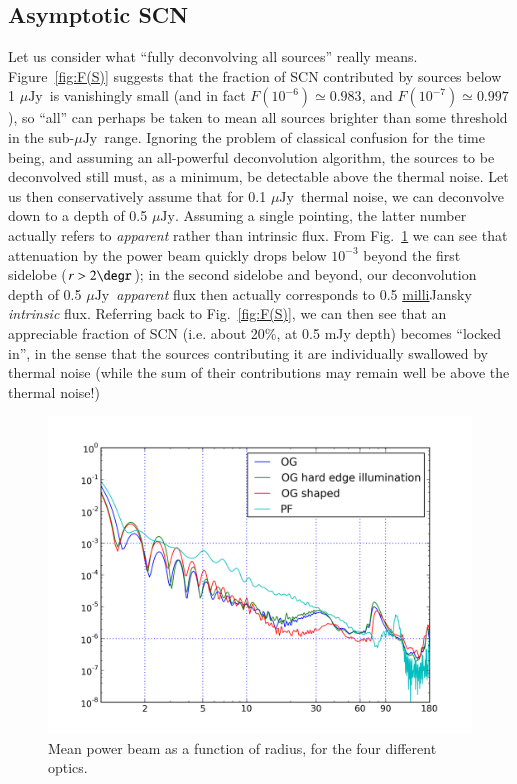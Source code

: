 \documentclass{aa}
\newcommand{\uJy}{$\mu\mathrm{Jy}$}
\begin{document}
\subsection{Asymptotic SCN}
\label{sec:asymptotic-fscn}

Let us consider what ``fully deconvolving all sources'' really means. Figure~\ref{fig:F(S)} suggests that the fraction of SCN contributed by sources below 1 \uJy\ is vanishingly small (and in fact $F(10^{-6})\simeq0.983$, and $F(10^{-7})\simeq0.997$), so ``all'' can perhaps be taken to mean all sources brighter than some threshold in the sub-\uJy\ range. Ignoring the problem of classical confusion for the time being, and assuming an all-powerful deconvolution algorithm, the sources to be deconvolved still must, as a minimum, be detectable above the thermal noise. Let us then conservatively assume that for 0.1 \uJy\ thermal noise, we can deconvolve down to a depth of 0.5 \uJy. Assuming a single pointing, the latter number actually refers to {\em apparent} rather than intrinsic flux. From Fig.~\ref{fig:power-beam} we can see that attenuation by the power beam quickly drops below $10^{-3}$ beyond the first sidelobe ($r>2\degr$); in the second sidelobe and beyond, our deconvolution depth of 0.5 \uJy\ {\em apparent} flux 
then actually corresponds to 0.5 \underline{milli}Jansky {\em intrinsic} flux. Referring back to Fig.~\ref{fig:F(S)}, we can then see that an appreciable fraction of SCN (i.e. about 20\%, at 0.5 mJy depth) becomes ``locked in'', in the sense that the sources contributing it are individually swallowed by thermal noise (while the sum of their contributions may remain well be above the thermal noise!)

\begin{figure}
\includegraphics[width=\columnwidth]{power-beam-radial}
\caption{\label{fig:power-beam}Mean power beam as a function of radius, for the four different optics.}
\end{figure}
\end{document}
